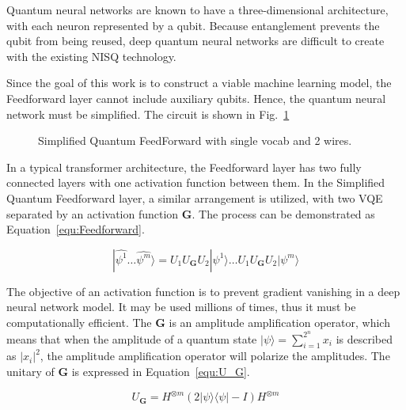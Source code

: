 Quantum neural networks are known to have a three-dimensional architecture, with each neuron represented by a qubit. Because entanglement prevents the qubit from being reused, deep quantum neural networks are difficult to create with the existing NISQ technology.

Since the goal of this work is to construct a viable machine learning model, the Feedforward layer cannot include auxiliary qubits. Hence, the quantum neural network must be simplified. The circuit is shown in Fig.~\ref{fig:feedforward}

\begin{figure}[htp!]
  \centering
  \caption{Simplified Quantum FeedForward with single vocab and 2 wires.}
  \label{fig:feedforward}
\end{figure}

In a typical transformer architecture, the Feedforward layer has two fully connected layers with one activation function between them. In the Simplified Quantum Feedforward layer, a similar arrangement is utilized, with two VQE separated by an activation function $\mathbf{G}$. The process can be demonstrated as Equation~\ref{equ:Feedforward}.

\begin{equation} \label{equ:Feedforward}
|\hat{\psi^1}\ldots\hat{\psi^m}\rangle = U_1U_\mathbf{G}U_2|\psi^1\rangle \ldots U_1U_\mathbf{G}U_2|\psi^m\rangle
\end{equation}

The objective of an activation function is to prevent gradient vanishing in a deep neural network model. It may be used millions of times, thus it must be computationally efficient.
The $\mathbf{G}$ is an amplitude amplification operator, which means that when the amplitude of a quantum state $|\psi\rangle = \sum^{2^{n}}_{i=1} x_i$ is described as $|x_i|^2$, the amplitude amplification operator will polarize the amplitudes. The unitary of $\mathbf{G}$ is expressed in Equation~\ref{equ:U_G}.


\begin{equation} \label{equ:U_G}
U_\mathbf{G} = H^{\otimes m}(2|\psi\rangle\langle \psi|- I)H^{\otimes m}
\end{equation}

